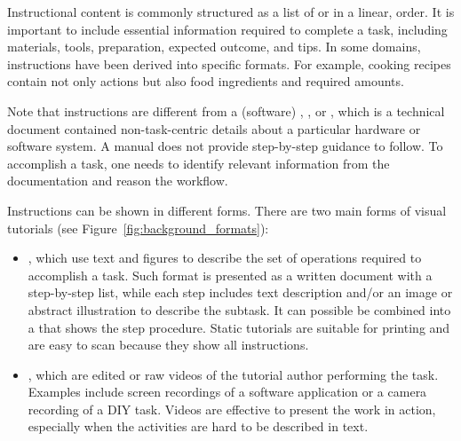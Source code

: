 %
Instructional content is commonly structured as a list of  or  in a linear,  order.
%
It is important to include essential information required to complete a task, including materials, tools, preparation, expected outcome, and tips.
%
In some domains, instructions have been derived into specific formats. For example, cooking recipes contain not only actions but also food ingredients and required amounts.

Note that instructions are different from a (software) , , or , which is a technical document contained non-task-centric details about a particular hardware or software system. A manual does not provide step-by-step guidance to follow. To accomplish a task, one needs to identify relevant information from the documentation and reason the workflow.


Instructions can be shown in different forms. There are two main forms of visual tutorials (see Figure~\ref{fig:background_formats}):
\begin{itemize}
  \item {}, which use text and figures to describe the set of operations required to accomplish a task. Such format is presented as a written document with a step-by-step list, while each step includes text description and/or an image or abstract illustration to describe the subtask. It can possible be combined into a  that shows the step procedure. Static tutorials are suitable for printing and are easy to scan because they show all instructions.
  \item {}, which are edited or raw videos of the tutorial author performing the task. Examples include screen recordings of a software application or a camera recording of a DIY task. Videos are effective to present the work in action, especially when the activities are hard to be described in text.
\end{itemize}

